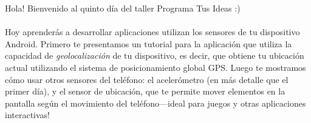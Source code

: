 Hola! Bienvenido al quinto día del taller Programa Tus Ideas :)

\paragraph{}
Hoy aprenderás a desarrollar aplicaciones utilizan los sensores de tu
dispositivo Android. Primero te presentamos un tutorial para la
aplicación  que utiliza la capacidad de
\emph{geolocalización} de tu dispositivo, es decir, que obtiene tu
ubicación actual utilizando el sistema de posicionamiento global
GPS. Luego te mostramos cómo usar otros sensores del teléfono: el
acelerómetro (en más detalle que el primer día), y el sensor de
ubicación, que te permite mover elementos en la pantalla según el
movimiento del teléfono---ideal para juegos y otras aplicaciones
interactivas!